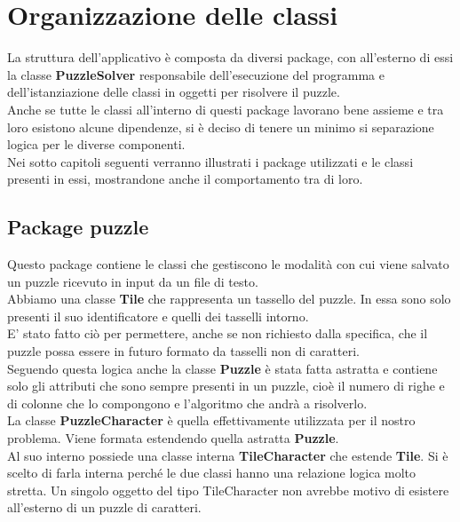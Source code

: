 % 
%
%

\section{Organizzazione delle classi}
La struttura dell'applicativo è composta da diversi package, con all'esterno di essi la classe \textbf{PuzzleSolver} responsabile dell'esecuzione del programma e dell'istanziazione delle classi in oggetti per risolvere il puzzle. \\
Anche se tutte le classi all'interno di questi package lavorano bene assieme e tra loro esistono alcune dipendenze, si è deciso di tenere un minimo si separazione logica per le diverse componenti. \\
Nei sotto capitoli seguenti  verranno illustrati i package utilizzati e le classi presenti in essi, mostrandone anche il comportamento tra di loro.

	\subsection{Package puzzle}
Questo package contiene le classi che gestiscono le modalità con cui viene salvato un puzzle ricevuto in input da un file di testo. \\
Abbiamo una classe \textbf{Tile} che rappresenta un tassello del puzzle. In essa sono solo presenti il suo identificatore e quelli dei tasselli intorno. \\
E' stato fatto ciò per permettere, anche se non richiesto dalla specifica, che il puzzle possa essere in futuro formato da tasselli non di caratteri. \\
Seguendo questa logica anche la classe \textbf{Puzzle} è stata fatta astratta e contiene solo gli attributi che sono sempre presenti in un puzzle, cioè il numero di righe e di colonne che lo compongono e l'algoritmo che andrà a risolverlo. \\
La classe \textbf{PuzzleCharacter} è quella effettivamente utilizzata per il nostro problema. Viene formata estendendo quella astratta \textbf{Puzzle}. \\
Al suo interno possiede una classe interna \textbf{TileCharacter} che estende \textbf{Tile}. Si è scelto di farla interna perché le due classi hanno una relazione logica molto stretta. Un singolo oggetto del tipo TileCharacter non avrebbe motivo di esistere all'esterno di un puzzle di caratteri. \\


